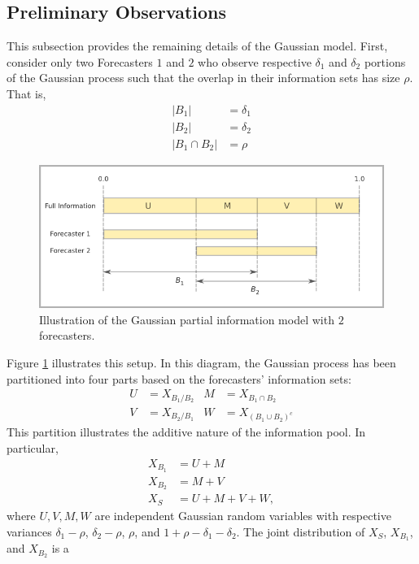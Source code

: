 \documentclass[11pt]{article}
\theoremstyle{definition}
\theoremstyle{definition}
\begin{document}
\subsection{Preliminary Observations}
\label{prelim}
This subsection provides the remaining details of the Gaussian model. First, consider only two Forecasters $1$ and $2$ who observe respective $\delta_1$ and
$\delta_2$ portions of the Gaussian process such that the overlap in their information sets has size $\rho$. That is,
\begin{align*}
|B_1| &= \delta_1\\
|B_2| &= \delta_2\\
|B_1 \cap B_2| &= \rho
\end{align*}
\begin{figure}[t]
   \includegraphics[width = \textwidth]{N=2} %
   \caption{Illustration of the Gaussian partial information model with $2$ forecasters.}
   \label{diagram2}
\end{figure}
Figure \ref{diagram2} illustrates this setup.  In this diagram, the
Gaussian process has been partitioned into four parts based on the
forecasters' information sets:
\begin{align*}
 U &= X_{B_1 / B_2}
& M &= X_{B_1 \cap B_2}\\
 V &= X_{B_2 / B_1}
& W &= X_{(B_1 \cup B_2)^c}
\end{align*}
This partition illustrates the additive nature of the information pool. In particular,
\begin{align*}
X_{B_1} &= U + M\\
X_{B_2} &= M + V\\
X_S &= U+M+V+W,
\end{align*}
where $U, V, M, W$ are independent Gaussian random variables with respective variances
$\delta_1-\rho$, $\delta_2-\rho$, $\rho$, and $1+\rho-\delta_1 -
\delta_2$. The joint distribution of $X_{S}$, $X_{B_1}$, and $X_{B_2}$ is a
\end{document}
